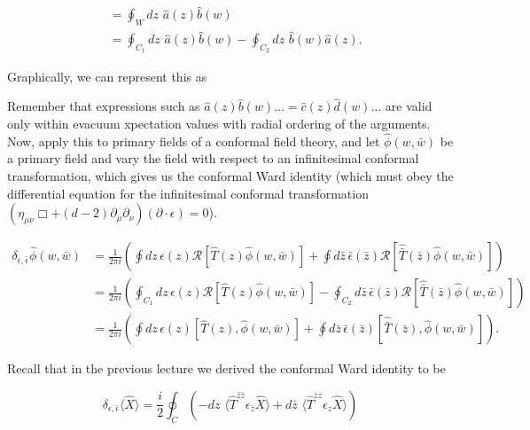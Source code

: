\begin{align}
[ \hat{A}, \hat{b} (w)] &= \oint_W dz \,\, \hat{a} (z) \hat{b} (w) \\
&= \oint_{C_1} dz \,\, \hat{a} (z) \hat{b} (w) - \oint_{C_2} dz \,\, \hat{b} (w) \hat{a} (z).
\end{align}

\noindent Graphically, we can represent this as


\noindent Remember that expressions such as $\hat{a} (z) \hat{b} (w) \dots = \hat{c} (z) \hat{d} (w) \dots$ are valid only within evacuum xpectation values with radial ordering of the arguments. \\

\noindent Now, apply this to primary fields of a conformal field theory, and let $\hat{\phi} (w, \bar{w})$ be a primary field and vary the field with respect to an infinitesimal conformal transformation, which gives us the conformal Ward identity (which must obey the differential equation for the infinitesimal conformal transformation $(\eta_{\mu\nu} \Box + (d-2) \partial_\mu \partial_\nu) (\partial \cdot \epsilon) = 0$).

\begin{align}
\delta_{\epsilon, \bar{\epsilon}} \hat{\phi} (w,\bar{w}) &= \frac{1}{2\pi i} \left( \oint dz \, \epsilon(z) \mathcal{R} [ \hat{T} (z) \hat{\phi} (w, \bar{w}) ] + \oint d\bar{z} \, \bar{\epsilon} (\bar{z}) \mathcal{R} [ \hat{\bar{T}} (\bar{z}) \hat{\phi} (w, \bar{w})] \right) \\
&= \frac{1}{2\pi i} \left( \oint_{C_1} dz \, \epsilon(z) \mathcal{R} [ \hat{T} (z) \hat{\phi} (w, \bar{w}) ] - \oint_{C_2} d\bar{z} \, \bar{\epsilon} (\bar{z}) \mathcal{R} [ \hat{\bar{T}} (\bar{z}) \hat{\phi} (w, \bar{w})] \right) \\
&= \frac{1}{2\pi i} \left( \oint dz \, \epsilon (z) [\hat{T} (z), \hat{\phi} (w,\bar{w})] + \oint d\bar{z} \, \bar{\epsilon} (\bar{z}) [ \hat{\bar{T}} (\bar{z}), \hat{\phi} (w, \bar{w}) ] \right).
\end{align}

\noindent Recall that in the previous lecture we derived the conformal Ward identity to be

\begin{equation}
\delta_{\epsilon, \bar{\epsilon}} \langle \hat{X} \rangle = \frac{i}{2} \oint_C \left(-dz \,\, \langle \hat{T}^{\bar{z}\bar{z}} \epsilon_{\bar{z}} \hat{X} \rangle + d\bar{z} \,\, \langle \hat{T}^{zz} \epsilon_z \hat{X} \rangle \right)
\end{equation}

